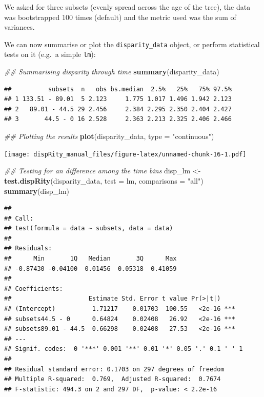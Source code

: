 \documentclass[
]{book}
\newenvironment{Shaded}{\begin{snugshade}}{\end{snugshade}}
\newcommand{\CommentTok}[1]{\textcolor[rgb]{0.56,0.35,0.01}{\textit{#1}}}
\newcommand{\DataTypeTok}[1]{\textcolor[rgb]{0.13,0.29,0.53}{#1}}
\newcommand{\KeywordTok}[1]{\textcolor[rgb]{0.13,0.29,0.53}{\textbf{#1}}}
\newcommand{\NormalTok}[1]{#1}
\newcommand{\StringTok}[1]{\textcolor[rgb]{0.31,0.60,0.02}{#1}}
\begin{document}
We asked for three subsets (evenly spread across the age of the tree), the data was bootstrapped 100 times (default) and the metric used was the sum of variances.

We can now summarise or plot the \texttt{disparity\_data} object, or perform statistical tests on it (e.g.~a simple \texttt{lm}):

\begin{Shaded}
\begin{Highlighting}[]
\CommentTok{\#\# Summarising disparity through time}
\KeywordTok{summary}\NormalTok{(disparity\_data)}
\end{Highlighting}
\end{Shaded}

\begin{verbatim}
##          subsets  n   obs bs.median  2.5%   25%   75% 97.5%
## 1 133.51 - 89.01  5 2.123     1.775 1.017 1.496 1.942 2.123
## 2   89.01 - 44.5 29 2.456     2.384 2.295 2.350 2.404 2.427
## 3       44.5 - 0 16 2.528     2.363 2.213 2.325 2.406 2.466
\end{verbatim}

\begin{Shaded}
\begin{Highlighting}[]
\CommentTok{\#\# Plotting the results}
\KeywordTok{plot}\NormalTok{(disparity\_data, }\DataTypeTok{type =} \StringTok{"continuous"}\NormalTok{)}
\end{Highlighting}
\end{Shaded}

\texttt{[image: dispRity\_manual\_files/figure-latex/unnamed-chunk-16-1.pdf]}

\begin{Shaded}
\begin{Highlighting}[]
\CommentTok{\#\# Testing for an difference among the time bins}
\NormalTok{disp\_lm \textless{}{-}}\StringTok{ }\KeywordTok{test.dispRity}\NormalTok{(disparity\_data, }\DataTypeTok{test =}\NormalTok{ lm,}
                         \DataTypeTok{comparisons =} \StringTok{"all"}\NormalTok{)}
\KeywordTok{summary}\NormalTok{(disp\_lm)}
\end{Highlighting}
\end{Shaded}

\begin{verbatim}
## 
## Call:
## test(formula = data ~ subsets, data = data)
## 
## Residuals:
##      Min       1Q   Median       3Q      Max 
## -0.87430 -0.04100  0.01456  0.05318  0.41059 
## 
## Coefficients:
##                     Estimate Std. Error t value Pr(>|t|)    
## (Intercept)          1.71217    0.01703  100.55   <2e-16 ***
## subsets44.5 - 0      0.64824    0.02408   26.92   <2e-16 ***
## subsets89.01 - 44.5  0.66298    0.02408   27.53   <2e-16 ***
## ---
## Signif. codes:  0 '***' 0.001 '**' 0.01 '*' 0.05 '.' 0.1 ' ' 1
## 
## Residual standard error: 0.1703 on 297 degrees of freedom
## Multiple R-squared:  0.769,  Adjusted R-squared:  0.7674 
## F-statistic: 494.3 on 2 and 297 DF,  p-value: < 2.2e-16
\end{verbatim}
\end{document}
